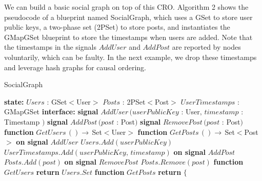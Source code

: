 \documentclass{article}
\begin{document}
We can build a basic social graph on top of this CRO. Algorithm 2 shows the pseudocode of a blueprint named SocialGraph, which uses a GSet to store user public keys, a two-phase set (2PSet) to store posts, and instantiates the GMapGSet blueprint to store the timestamps when users are added. Note that the timestamps in the signals $AddUser$ and $AddPost$ are reported by nodes voluntarily, which can be faulty. In the next example, we drop these timestamps and leverage hash graphs for causal ordering.

\begin{algorithm}
\caption{SocialGraph}
\begin{algorithmic}
\State \textbf{state:}
\State \hspace{\algorithmicindent} $Users$ : GSet$<$User$>$ 
\State \hspace{\algorithmicindent} $Posts$ : 2PSet$<$Post$>$ 
\State \hspace{\algorithmicindent} $UserTimestamps$ : GMapGSet 
\State
\State \textbf{interface:}
\State \hspace{\algorithmicindent} \textbf{signal} $AddUser\,(userPublicKey$ : User$,\,timestamp$ : Timestamp $)$
\State \hspace{\algorithmicindent} \textbf{signal} $AddPost\,(post$ : Post$)$
\State \hspace{\algorithmicindent} \textbf{signal} $RemovePost\,(post$ : Post$)$
\State \hspace{\algorithmicindent} \textbf{function} $GetUsers\,() \rightarrow\, $Set$<$User$>$
\State \hspace{\algorithmicindent} \textbf{function} $GetPosts\,() \rightarrow\, $Set$<$Post$>$
\State
\State \textbf{on signal} $AddUser$
\State \hspace{\algorithmicindent} $Users.Add(userPublicKey)$
\State \hspace{\algorithmicindent} $UserTimestamps.Add(userPublicKey,\,timestamp)$
\State
\State \textbf{on signal} $AddPost$
\State \hspace{\algorithmicindent} $Posts.Add(post)$
\State
\State \textbf{on signal} $RemovePost$
\State \hspace{\algorithmicindent} $Posts.Remove(post)$
\State
\State \textbf{function} $GetUsers$
\State \hspace{\algorithmicindent}\textbf{return} $Users.Set$
\State
\State \textbf{function} $GetPosts$
\State \hspace{\algorithmicindent}\textbf{return} $\{$

\end{algorithmic}
\end{algorithm}
\end{document}
